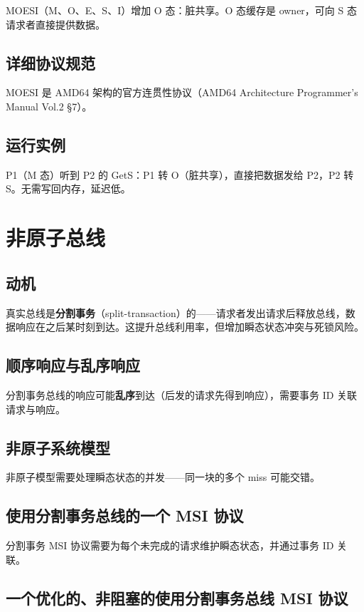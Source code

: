MOESI（M、O、E、S、I）增加 O 态：脏共享。O 态缓存是 owner，可向 S 态请求者直接提供数据。

\subsection{详细协议规范}

MOESI 是 AMD64 架构的官方连贯性协议（AMD64 Architecture Programmer's Manual Vol.2 §7）。

\subsection{运行实例}

P1（M 态）听到 P2 的 GetS：P1 转 O（脏共享），直接把数据发给 P2，P2 转 S。无需写回内存，延迟低。

\section{非原子总线}

\subsection{动机}

真实总线是\textbf{分割事务}（split-transaction）的——请求者发出请求后释放总线，数据响应在之后某时刻到达。这提升总线利用率，但增加瞬态状态冲突与死锁风险。

\subsection{顺序响应与乱序响应}

分割事务总线的响应可能\textbf{乱序}到达（后发的请求先得到响应），需要事务 ID 关联请求与响应。

\subsection{非原子系统模型}

非原子模型需要处理瞬态状态的并发——同一块的多个 miss 可能交错。

\subsection{使用分割事务总线的一个 MSI 协议}

分割事务 MSI 协议需要为每个未完成的请求维护瞬态状态，并通过事务 ID 关联。

\subsection{一个优化的、非阻塞的使用分割事务总线 MSI 协议}

